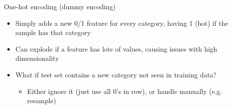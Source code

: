 \begin{frame}{One-hot encoding (dummy encoding)}
    \begin{itemize}
        \item Simply adds a new 0/1 feature for every category, having 1 (hot) if the sample has that category
        \item Can explode if a feature has lots of values, causing issues with high dimensionality
        \item What if test set contains a new category not seen in training data?
        \begin{itemize}
            \item Either ignore it (just use all 0's in row), or handle manually (e.g. resample)
        \end{itemize}
    \end{itemize}

    \vspace{1em}

\end{frame}



